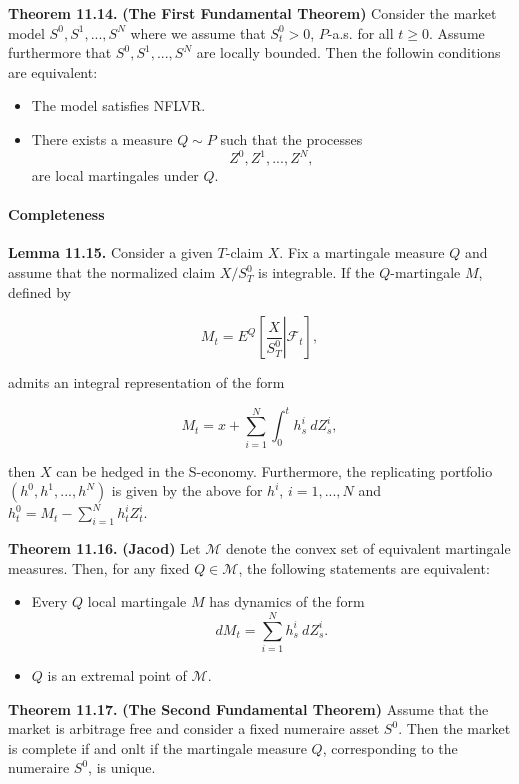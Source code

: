 \documentclass[
]{article}
\providecommand{\tightlist}{%
  \setlength{\itemsep}{0pt}\setlength{\parskip}{0pt}}
\begin{document}
\textbf{Theorem 11.14.} \textbf{(The First Fundamental Theorem)}
Consider the market model \(S^0,S^1,...,S^N\) where we assume that
\(S^0_t>0\), \(P\)-a.s. for all \(t\ge 0\). Assume furthermore that
\(S^0,S^1,...,S^N\) are locally bounded. Then the followin conditions
are equivalent:

\begin{itemize}
\tightlist
\item
  The model satisfies NFLVR.
\item
  There exists a measure \(Q\sim P\) such that the processes \[
    Z^0,Z^1,...,Z^N,
    \] are local martingales under \(Q\).
\end{itemize}

\hypertarget{completeness-1}{%
\paragraph{Completeness}\label{completeness-1}}

\textbf{Lemma 11.15.} Consider a given \(T\)-claim \(X\). Fix a
martingale measure \(Q\) and assume that the normalized claim
\(X/S^0_T\) is integrable. If the \(Q\)-martingale \(M\), defined by

\[
M_t=E^Q\left[\left. \frac{X}{S^0_T}\right\vert \mathcal{F}_t\right],
\]

admits an integral representation of the form

\[
M_t=x+\sum_{i=1}^N\int_0^th_s^i\ dZ_s^i,
\]

then \(X\) can be hedged in the S-economy. Furthermore, the replicating
portfolio \((h^0,h^1,...,h^N)\) is given by the above for \(h^i\),
\(i=1,...,N\) and \(h_t^0=M_t-\sum_{i=1}^Nh_t^iZ_t^i\).

\textbf{Theorem 11.16.} \textbf{(Jacod)} Let \(\mathcal{M}\) denote the
convex set of equivalent martingale measures. Then, for any fixed
\(Q\in\mathcal{M}\), the following statements are equivalent:

\begin{itemize}
\tightlist
\item
  Every \(Q\) local martingale \(M\) has dynamics of the form \[
    dM_t=\sum_{i=1}^Nh_s^i\ dZ_s^i.
    \]
\item
  \(Q\) is an extremal point of \(\mathcal{M}\).
\end{itemize}

\textbf{Theorem 11.17.} \textbf{(The Second Fundamental Theorem)} Assume
that the market is arbitrage free and consider a fixed numeraire asset
\(S^0\). Then the market is complete if and onlt if the martingale
measure \(Q\), corresponding to the numeraire \(S^0\), is unique.
\end{document}
